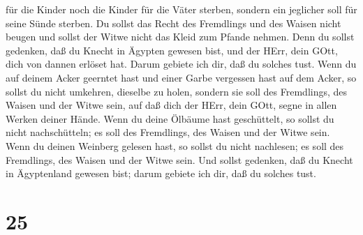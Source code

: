 für die Kinder noch die Kinder für die Väter sterben, sondern ein
jeglicher soll für seine Sünde sterben.  Du sollst das
Recht des Fremdlings und des Waisen nicht beugen und sollst der Witwe
nicht das Kleid zum Pfande nehmen.  Denn du sollst
gedenken, daß du Knecht in Ägypten gewesen bist, und der HErr, dein
GOtt, dich von dannen erlöset hat. Darum gebiete ich dir, daß du solches
tust.  Wenn du auf deinem Acker geerntet hast und einer
Garbe vergessen hast auf dem Acker, so sollst du nicht umkehren,
dieselbe zu holen, sondern sie soll des Fremdlings, des Waisen und der
Witwe sein, auf daß dich der HErr, dein GOtt, segne in allen Werken
deiner Hände.  Wenn du deine Ölbäume hast geschüttelt, so
sollst du nicht nachschütteln; es soll des Fremdlings, des Waisen und
der Witwe sein.  Wenn du deinen Weinberg gelesen hast, so
sollst du nicht nachlesen; es soll des Fremdlings, des Waisen und der
Witwe sein.  Und sollst gedenken, daß du Knecht in
Ägyptenland gewesen bist; darum gebiete ich dir, daß du solches tust.

\hypertarget{section-24}{%
\section{25}\label{section-24}}

